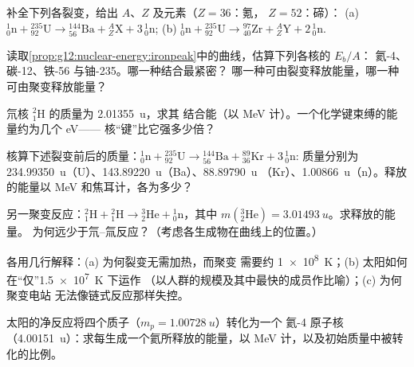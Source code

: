 \begin{exercise}[$\star$]\label{exo:g12:nuclear-energy:4}
补全下列各裂变，给出 $A$、$Z$ 及元素（$Z = 36$：氪，
$Z = 52$：碲）：
(a) ${}^{1}_{0}\mathrm{n} + {}^{235}_{92}\mathrm{U} \to
{}^{144}_{56}\mathrm{Ba} + {}^{A}_{Z}\mathrm{X} + 3\,{}^{1}_{0}\mathrm{n}$;
(b) ${}^{1}_{0}\mathrm{n} + {}^{235}_{92}\mathrm{U} \to
{}^{97}_{40}\mathrm{Zr} + {}^{A}_{Z}\mathrm{Y} + 2\,{}^{1}_{0}\mathrm{n}$.
\end{exercise}

\begin{exercise}[$\star$]\label{exo:g12:nuclear-energy:5}
读取\cref{prop:g12:nuclear-energy:ironpeak}中的曲线，估算下列各核的 $E_b/A$：
氦-4、碳-12、铁-56 与铀-235。哪一种结合最紧密？
哪一种可由裂变释放能量，哪一种可由聚变释放能量？
\end{exercise}

\begin{exercise}[$\star\star$]\label{exo:g12:nuclear-energy:6}
氘核 ${}^{2}_{1}\mathrm{H}$ 的质量为 \qty{2.01355}{u}，求其
结合能（以 \unit{MeV} 计）。一个化学键束缚的能量约为几个 \unit{eV}——
核“键”比它强多少倍？
\end{exercise}

\begin{exercise}[$\star\star$]\label{exo:g12:nuclear-energy:7}
核算下述裂变前后的质量：${}^{1}_{0}\mathrm{n} + {}^{235}_{92}\mathrm{U} \to
{}^{144}_{56}\mathrm{Ba} + {}^{89}_{36}\mathrm{Kr} + 3\,{}^{1}_{0}\mathrm{n}$:
质量分别为 \qty{234.99350}{u}（U）、\qty{143.89220}{u}（Ba）、\qty{88.89790}{u}
（Kr）、\qty{1.00866}{u}（n）。释放的能量以 \unit{MeV} 和焦耳计，各为多少？
\end{exercise}

\begin{exercise}[$\star\star$]\label{exo:g12:nuclear-energy:8}
另一聚变反应：${}^{2}_{1}\mathrm{H} + {}^{2}_{1}\mathrm{H} \to
{}^{3}_{2}\mathrm{He} + {}^{1}_{0}\mathrm{n}$，其中
$m({}^{3}_{2}\mathrm{He}) = \qty{3.01493}{u}$。求释放的能量。
为何远少于氘–氚反应？（考虑各生成物在曲线上的位置。）
\end{exercise}

\begin{exercise}[$\star\star$]\label{exo:g12:nuclear-energy:9}
各用几行解释：(a) 为何裂变无需加热，而聚变
需要约 \qty{1e8}{K}；(b) 太阳如何在“仅”\qty{1.5e7}{K} 下运作
（以人群的规模及其中最快的成员作比喻）；(c) 为何聚变电站
无法像链式反应那样失控。
\end{exercise}

\begin{exercise}[$\star\star$]\label{exo:g12:nuclear-energy:10}
太阳的净反应将四个质子（$m_p = \qty{1.00728}{u}$）转化为一个
氦-4 原子核（\qty{4.00151}{u}）：求每生成一个氦所释放的能量，以
\unit{MeV} 计，以及初始质量中被转化的比例。
\end{exercise}

